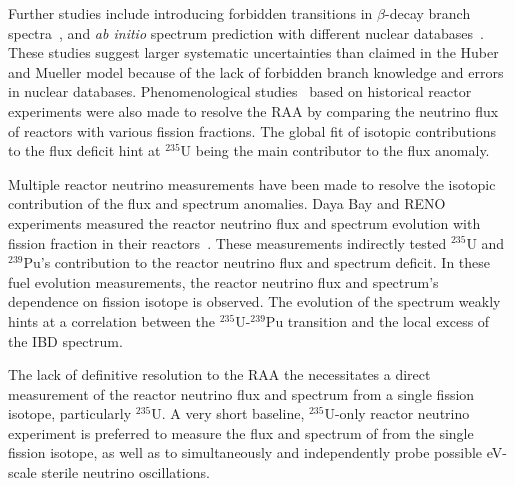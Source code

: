 
    Further studies include introducing forbidden transitions in $\beta$-decay branch spectra~\cite{bib:hayes}, and \textit{ab initio} spectrum prediction with different nuclear databases~\cite{bib:dwyer}.
    These studies suggest larger systematic uncertainties than claimed in the Huber and Mueller model because of the lack of forbidden branch knowledge and errors in nuclear databases.
    Phenomenological studies~\cite{bib:giunti2019} based on historical reactor experiments were also made to resolve the RAA by comparing the neutrino flux of reactors with various fission fractions.
    The global fit of isotopic contributions to the flux deficit hint at $^{235}$U being the main contributor to the flux anomaly. 
    
    Multiple reactor neutrino measurements have been made to resolve the isotopic contribution of the flux and spectrum anomalies.
    Daya Bay and RENO experiments measured the reactor neutrino flux and spectrum evolution with fission fraction in their reactors~\cite{bib:DYBEvo, bib:RENOevolution}. 
    These measurements indirectly tested $^{235}$U and $^{239}$Pu's contribution to the reactor neutrino flux and spectrum deficit.
    In these fuel evolution measurements, the reactor neutrino flux and spectrum's dependence on fission isotope is observed.
    The evolution of the spectrum weakly hints at a correlation between the $^{235}$U-$^{239}$Pu transition and the local excess of the IBD spectrum.

    The lack of definitive resolution to the RAA the necessitates a direct measurement of the reactor neutrino flux and spectrum from a single fission isotope, particularly $^{235}$U.
    A very short baseline, $^{235}$U-only reactor neutrino experiment is preferred to measure the flux and spectrum of \nuebar from the single fission isotope, as well as to simultaneously and independently probe possible eV-scale sterile neutrino oscillations.
